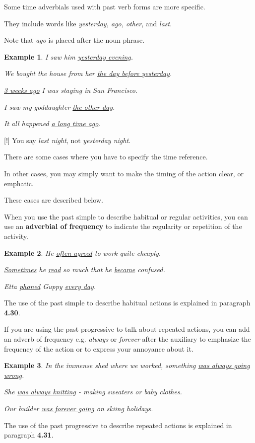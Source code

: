 \documentclass[oneside]{book}
\numberwithin{equation}{section}
\newtheorem{example}{Example}[section]
\begin{document}
%
Some time adverbials used with past verb forms are more specific.

They include words like \textit{yesterday, ago, other}, and \textit{last}.

Note that \textit{ago} is placed after the noun phrase.
\begin{example}
    I saw him \underline{yesterday evening}.
    
    We bought the house from her \underline{the day before yesterday}.
    
    \underline{3 weeks ago} I was staying in San Francisco.
    
    I saw my goddaughter \underline{the other day}.
    
    It all happened \underline{a long time ago}.
\end{example}
%
\noindent{} [!] You say \textit{last night}, not \textit{yesterday night}.

%
\noindent{} There are some cases where you have to specify the time reference.

In other cases, you may simply want to make the timing of the action clear, or emphatic.

These cases are described below.

%
\noindent{} When you use the past simple to describe habitual or regular activities, you can use an \textbf{adverbial of frequency} to indicate the regularity or repetition of the activity.
\begin{example}
    He \underline{often agreed} to work quite cheaply.
    
    \underline{Sometimes} he \underline{read} so much that he \underline{became} confused.
    
    Etta \underline{phoned} Guppy \underline{every day}.
\end{example}
The use of the past simple to describe habitual actions is explained in paragraph \textbf{4.30}.

%
\noindent{} If you are using the past progressive to talk about repeated actions, you can add an adverb of frequency e.g. \textit{always} or \textit{forever} after the auxiliary to emphasize the frequency of the action or to express your annoyance about it.
\begin{example}
    In the immense shed where we worked, something \underline{was always going wrong}.
    
    She \underline{was always knitting} - making sweaters or baby clothes.
    
    Our builder \underline{was forever going} on skiing holidays.
\end{example}
The use of the past progressive to describe repeated actions is explained in paragraph \textbf{4.31}.
\end{document}
